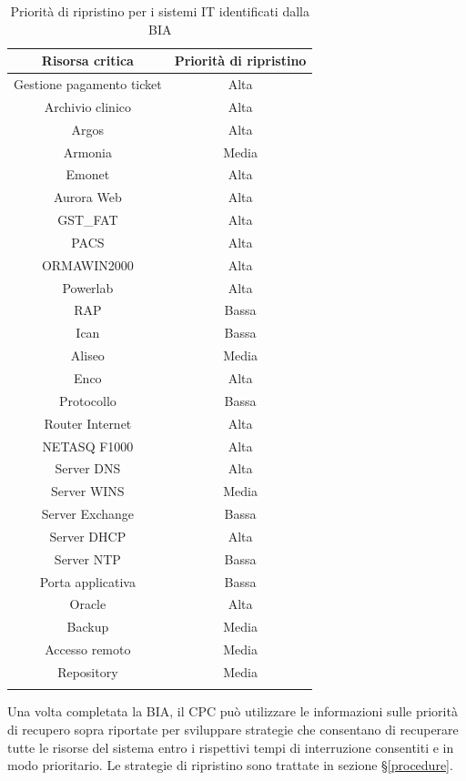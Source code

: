 \documentclass[12pt, a4paper, titlepage]{report}
\begin{document}
		\begin{longtable}{| c | c |}
				\hline
				\textbf{Risorsa critica} & \textbf{Priorità di ripristino} \\ \hline
				Gestione pagamento ticket & Alta\\ \hline 
				Archivio clinico & Alta\\ \hline
				Argos & Alta\\ \hline
				Armonia & Media\\ \hline 
				Emonet & Alta\\ \hline
				Aurora Web & Alta\\ \hline
				GST\_FAT & Alta\\ \hline 
				PACS & Alta\\ \hline 
				ORMAWIN2000 & Alta\\ \hline 
				Powerlab & Alta\\ \hline 
				RAP & Bassa\\ \hline 
				Ican & Bassa\\ \hline 
				Aliseo & Media\\ \hline 
				Enco & Alta\\ \hline
				Protocollo & Bassa\\ \hline 
				Router Internet & Alta\\ \hline 
				NETASQ F1000 & Alta\\ \hline 
				Server DNS & Alta\\ \hline 
				Server WINS & Media\\ \hline 
				Server Exchange & Bassa\\ \hline 
				Server DHCP & Alta\\ \hline 
				Server NTP & Bassa\\ \hline 
				Porta applicativa & Bassa\\ \hline 
				Oracle & Alta\\ \hline 
				Backup & Media\\ \hline 
				Accesso remoto & Media\\ \hline 
				Repository & Media\\ \hline
				\caption[BIA - Priorità di ripristino per i sistemi IT]{Priorità di ripristino per i sistemi IT identificati dalla BIA}
		\end{longtable}

		Una volta completata la BIA, il CPC può utilizzare le informazioni sulle priorità di recupero sopra riportate per sviluppare strategie che consentano di recuperare tutte le risorse del sistema entro i rispettivi tempi di interruzione consentiti e in modo prioritario.
		Le strategie di ripristino sono trattate in sezione §\ref{procedure}.
		
\end{document}
